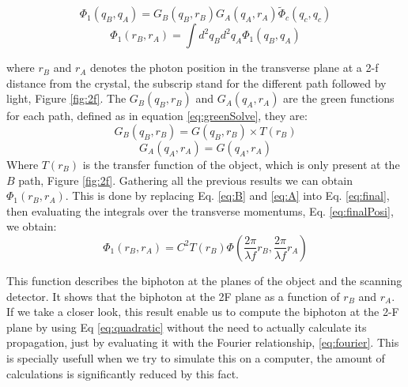 \begin{equation}\label{eq:final}
\Phi_1 (q_B , q_A )= G_B(q_B,r_B) G_A(q_A,r_A) \tilde{\Phi}_c(q_c,q_c)
\end{equation}
\begin{equation}\label{eq:finalPosi}
\Phi_1 (r_B , r_A )= \int d^2 q_B d^2 q_A \Phi_1 (q_B , q_A )
\end{equation}

where $r_B$ and $r_A$ denotes the photon position in the transverse plane at a 2-f distance from the 
crystal, the subscrip stand for the different path followed by light, Figure \ref{fig:2f}. The $G_B(q_B,r_B)$
and $G_A(q_A,r_A)$ are the green functions for each path, defined as in equation \ref{eq:greenSolve}, they are:
\begin{equation}\label{eq:B}
G_B(q_B,r_B)=G(q_B,r_B) \times T(r_B) 
\end{equation}
\begin{equation}\label{eq:A}
G_A(q_A,r_A)=G(q_A,r_A)
\end{equation}
Where $T(r_B)$ is the transfer function of the object, which is only present at the $B$ path, Figure \ref{fig:2f}.
Gathering all the previous results we can obtain $\Phi_1 (r_B , r_A )$. This is done by replacing
Eq. \ref{eq:B} and \ref{eq:A} into Eq. \ref{eq:final}, then evaluating the integrals over the transverse 
momentums, Eq. \ref{eq:finalPosi}, we obtain:
\begin{equation}\label{eq:finalBiphoton}
\Phi_1 (r_B , r_A )=C^2 T(r_B) \Phi (\frac{2 \pi}{\lambda f}r_B, \frac{2 \pi}{\lambda f}r_A)
\end{equation}

This function describes the biphoton at the planes of the object and the scanning detector. It shows 
that the biphoton at the 2F plane as a function of $r_B$ and $r_A$. If we take a closer look, this result
enable us to compute the biphoton at the 2-F plane by using Eq \ref{eq:quadratic} without the need to actually calculate its propagation, just by 
evaluating it with the Fourier relationship, \ref{eq:fourier}. This is specially usefull when we try to 
simulate this on a computer, the amount of calculations is significantly reduced by this fact.

